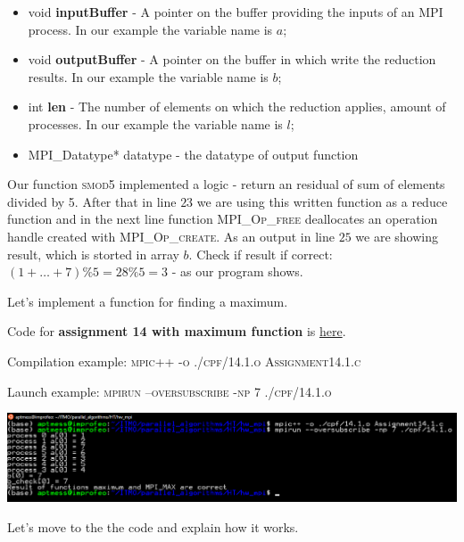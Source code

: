 \documentclass[%
12pt, %
final, %
oneside, %
onecolumn, %
centertags]{article} %
\theoremstyle{plain}
\theoremstyle{definition}
\theoremstyle{remark}
\begin{document}
\begin{itemize}
	\item void \textbf{inputBuffer} - A pointer on the buffer providing the inputs of an MPI process. In our example the variable name is $a$;
	\item void \textbf{outputBuffer} - A pointer on the buffer in which write the reduction results. In our example the variable name is $b$;
	\item int \textbf{len} -  The number of elements on which the reduction applies, amount of processes. In our example the variable name is $l$;
	\item MPI\_Datatype* datatype - the datatype of output function
\end{itemize}

Our function \textsc{smod5} implemented a logic - return an residual of sum of elements divided by 5. After that in line $23$ we are using this written function as a reduce function and in the next line function \textsc{MPI\_Op\_free} deallocates an operation handle created with \textsc{MPI\_Op\_create}. As an output in line $25$ we are showing result, which is storted in array $b$. Check if result if correct: $(1 + \ldots + 7) \% 5 = 28 \% 5 = 3$ - as our program shows.

Let's implement a function for finding a maximum.

Code for \textbf{assignment 14 with maximum function} is \href{https:\//github.com/aptmess/parallel_algorithms/blob/master/HT/hw_mpi/Assignment14.1.c}{here}.

Compilation example: \textsc{mpic++ -o ./cpf/14.1.o Assignment14.1.c}

Launch example: \textsc{mpirun --oversubscribe -np 7 ./cpf/14.1.o}

\begin{center}
\includegraphics[scale=0.55]{14.1.png}
\end{center}

Let's move to the the code and explain how it works.
\end{document}
